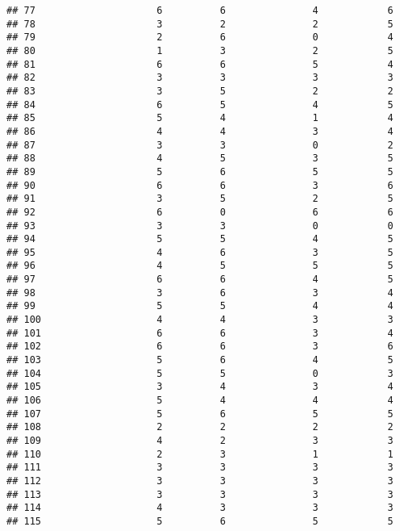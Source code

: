 \documentclass[
]{article}
\begin{document}
\begin{verbatim}
## 77                     6          6               4            6
## 78                     3          2               2            5
## 79                     2          6               0            4
## 80                     1          3               2            5
## 81                     6          6               5            4
## 82                     3          3               3            3
## 83                     3          5               2            2
## 84                     6          5               4            5
## 85                     5          4               1            4
## 86                     4          4               3            4
## 87                     3          3               0            2
## 88                     4          5               3            5
## 89                     5          6               5            5
## 90                     6          6               3            6
## 91                     3          5               2            5
## 92                     6          0               6            6
## 93                     3          3               0            0
## 94                     5          5               4            5
## 95                     4          6               3            5
## 96                     4          5               5            5
## 97                     6          6               4            5
## 98                     3          6               3            4
## 99                     5          5               4            4
## 100                    4          4               3            3
## 101                    6          6               3            4
## 102                    6          6               3            6
## 103                    5          6               4            5
## 104                    5          5               0            3
## 105                    3          4               3            4
## 106                    5          4               4            4
## 107                    5          6               5            5
## 108                    2          2               2            2
## 109                    4          2               3            3
## 110                    2          3               1            1
## 111                    3          3               3            3
## 112                    3          3               3            3
## 113                    3          3               3            3
## 114                    4          3               3            3
## 115                    5          6               5            5

\end{verbatim}
\end{document}
